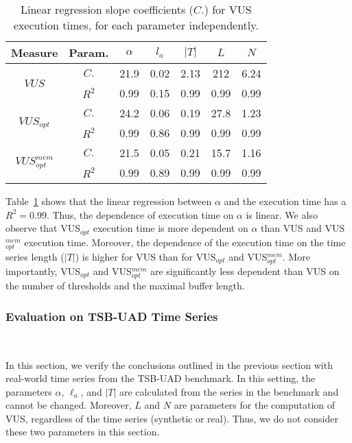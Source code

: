 \begin{table}[tb]
    \centering
    \caption{Linear regression slope coefficients ($C.$) for VUS execution times, for each parameter independently. }
    \begin{tabular}{|c|c|c|c|c|c|c|} 
 \hline
 Measure & Param. & $\alpha$ & $l_a$ & $|T|$ & $L$ & $N$\\ [0.5ex] 
 \hline\hline
 \multirow{2}{*}{$VUS$} & $C.$ & 21.9 & 0.02 & 2.13 & 212 & 6.24\\\cline{2-7}
 & {$R^2$} & 0.99 & 0.15 & 0.99 & 0.99 & 0.99 \\   
 \hline
  \multirow{2}{*}{$VUS_{opt}$} & $C.$ & 24.2  & 0.06 & 0.19 & 27.8 & 1.23\\\cline{2-7}
  & $R^2$& 0.99 & 0.86 & 0.99 & 0.99 & 0.99\\ 
 \hline
 \multirow{2}{*}{$VUS_{opt}^{mem}$} & $C.$ & 21.5 & 0.05 & 0.21 & 15.7 & 1.16\\\cline{2-7}
  & $R^2$ & 0.99 & 0.89 & 0.99 & 0.99 & 0.99\\[1ex] 
 \hline
\end{tabular}
    \label{tab:parameter_linear_coeff}
\end{table}

Table~\ref{tab:parameter_linear_coeff} shows that the linear regression between $\alpha$ and the execution time has a $R^2=0.99$. Thus, the dependence of execution time on $\alpha$ is linear. We also observe that VUS$_{opt}$ execution time is more dependent on $\alpha$ than VUS and VUS$_{opt}^{mem}$ execution time.
Moreover, the dependence of the execution time on the time series length ($|T|$) is higher for VUS than for VUS$_{opt}$ and VUS$_{opt}^{mem}$. 
More importantly, VUS$_{opt}$ and VUS$_{opt}^{mem}$ are significantly less dependent than VUS on the number of thresholds and the maximal buffer length. 







\subsubsection{Evaluation on TSB-UAD Time Series}\hfill\\
\label{sec:TSB_eval_time}

In this section, we verify the conclusions outlined in the previous section with real-world time series from the TSB-UAD benchmark. 
In this setting, the parameters $\alpha$, $\ell_a$, and $|T|$ are calculated from the series in the benchmark and cannot be changed. Moreover, $L$ and $N$ are parameters for the computation of VUS, regardless of the time series (synthetic or real). Thus, we do not consider these two parameters in this section.

